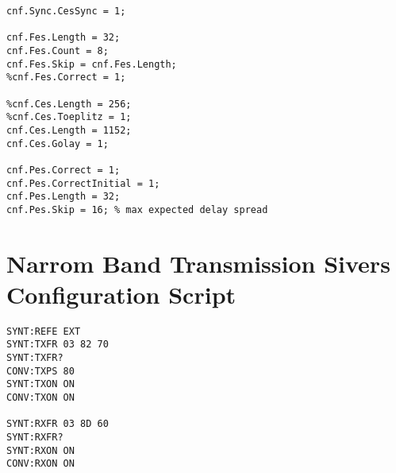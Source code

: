 \begin{appendix}
\begin{verbatim}
cnf.Sync.CesSync = 1;

cnf.Fes.Length = 32;
cnf.Fes.Count = 8;
cnf.Fes.Skip = cnf.Fes.Length;
%cnf.Fes.Correct = 1;

%cnf.Ces.Length = 256;
%cnf.Ces.Toeplitz = 1;
cnf.Ces.Length = 1152;
cnf.Ces.Golay = 1;

cnf.Pes.Correct = 1;
cnf.Pes.CorrectInitial = 1;
cnf.Pes.Length = 32;
cnf.Pes.Skip = 16; % max expected delay spread
\end{verbatim}

\chapter{Narrom Band Transmission Sivers Configuration Script}
\label{app:res_450_sivers_on}
\begin{verbatim}
SYNT:REFE EXT
SYNT:TXFR 03 82 70
SYNT:TXFR?
CONV:TXPS 80
SYNT:TXON ON
CONV:TXON ON

SYNT:RXFR 03 8D 60
SYNT:RXFR?
SYNT:RXON ON
CONV:RXON ON
\end{verbatim}

\end{appendix}
